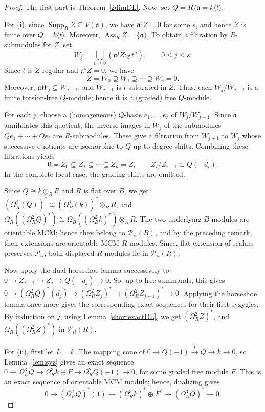 \documentclass[11pt,letterpaper]{amsart}
\newcommand{\x}{\xrightarrow{}}
\DeclareMathOperator{\Ass}{Ass}
\DeclareMathOperator{\Supp}{Supp}
\theoremstyle{plain}
\theoremstyle{definition}
\theoremstyle{remark}
\begin{document}
\begin{proof}
The first part is Theorem~\ref{2dimDL}. Now, set $Q=R/\mathfrak a=k\langle t\rangle$.

For (i), since $\Supp_R Z\subseteq V(\mathfrak a)$, we have
$\mathfrak a^sZ=0$ for some $s$, and hence $Z$ is finite over
$Q=k\langle t\rangle$. Moreover, $\Ass_R Z=\{\mathfrak a\}$. 
To obtain a filtration by $R$-submodules for $Z$, set
\[
W_j=\bigcup_{n\ge 0}(\mathfrak a^jZ:_Z t^n),
\qquad 0\leq j\leq s.
\]
Since $t$ is $Z$-regular and $\mathfrak a^sZ=0$,
we have
\[
Z=W_0\supseteq W_1\supseteq\cdots\supseteq W_s=0.
\]
Moreover, $\mathfrak a W_j\subseteq W_{j+1}$,
and $W_{j+1}$ is $t$-saturated in $Z$.
Thus, each $W_j/W_{j+1}$ is a finite torsion-free
$Q$-module; hence it is a (graded) free $Q$-module.

For each $j$, choose a (homogeneous) $Q$-basis $\overline e_1,\ldots,\overline e_r$ of $W_j/W_{j+1}$. Since $\mathfrak a$ annihilates this quotient, the inverse images in $W_j$ of the submodules $Q\overline e_1+\cdots+Q\overline e_i$ are $R$-submodules. These give a filtration from $W_{j+1}$ to $W_j$ whose successive quotients are isomorphic to $Q$ up to degree shifts. Combining these filtrations yields \[ 0=Z_0\subseteq Z_1\subseteq\cdots\subseteq Z_h=Z, \qquad Z_i/Z_{i-1}\cong Q(-d_i). \]
In the complete local case, the grading shifts are omitted.

Since $Q\cong k\otimes_B R$ and $R$ is flat over $B$, we get $(\Omega_R^j(Q))^*
\cong(\Omega_B^j(k))^*\otimes_B R$, and $\Omega_R((\Omega_R^2Q)^*)\cong\Omega_B((\Omega_B^2k)^*)\otimes_B R$.
The two underlying $B$-modules are orientable MCM; hence they belong to
$\mathcal P_{ii}(B)$, and by the preceding remark, their extensions are
orientable MCM $R$-modules. Since, flat extension of scalars preserves
$\mathcal P_{ii}$, both displayed $R$-modules lie in $\mathcal P_{ii}(R)$.

Now apply the dual horseshoe lemma successively to
$0\to Z_{j-1}\to Z_j\to Q(-d_j)\to0$. So, up to free summands, this gives $0\to(\Omega_R^2Q)^*(d_j)\to(\Omega_R^2Z_j)^*\to(\Omega_R^2Z_{j-1})^*\to0$.
Applying the horseshoe lemma once more gives the corresponding exact
sequences for their first syzygies. By induction on $j$, using Lemma~\ref{shortexactDL}, we get $(\Omega_R^2Z)^*$, and $
\Omega_R((\Omega_R^2Z)^*)$ in $\mathcal P_{ii}(R)$. 

For (ii), first let $L=k$. The mapping cone of $0\to Q(-1)\xrightarrow{t}Q\to k\to0$, so Lemma~\ref{lem:syz} gives an exact sequence $0\to\Omega_R^3Q\to\Omega_R^3k\oplus F\to\Omega_R^2Q(-1)\to0$, for some graded free module $F$. This is an exact sequence of orientable MCM module; hence,  dualizing gives $$0\x(\Omega_R^2Q)^*(1)\x(\Omega_R^3k)^*\oplus F^*\x(\Omega_R^3Q)^*\x0.$$ 


\end{proof}
\end{document}
